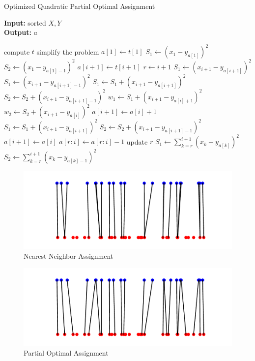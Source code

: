 \documentclass[a4paper,12pt]{article}
\begin{document}
\begin{algorithm}
\caption{Optimized Quadratic Partial Optimal Assignment}\label{a_quad_opt}
\hspace*{\algorithmicindent} \textbf{Input:} sorted $X,Y$\\
\hspace*{\algorithmicindent} \textbf{Output:} $a$ 
\begin{algorithmic}[1]
\State compute $t$
\State simplify the problem
\State $a[1] \gets t[1]$
\State $S_1 \gets (x_{1} - y_{a[1]})^2$
\State $S_2 \gets (x_{1} - y_{a[1]-1})^2$
		\State $a[i+1] \gets t[i+1]$
			\State $r \gets i+1$
			\State $S_1 \gets (x_{i+1} - y_{a[i+1]})^2$
			\State $S_1 \gets (x_{i+1} - y_{a[i+1]-1})^2$
		\Else {}
        	\State $S_1 \gets S_1 + (x_{i+1} - y_{a[i+1]})^2$
        	\State $S_2 \gets S_2 + (x_{i+1} - y_{a[i+1]-1})^2$			
		\EndIf
    \Else
        \State $w_1 \gets S_1 + (x_{i+1} - y_{a[i]+1})^2$
        \State $w_2 \gets S_2 + (x_{i+1} - y_{a[i]})^2$
         
        	\State $a[i+1] \gets a[i]+1$
        	\State $S_1 \gets S_1 + (x_{i+1} - y_{a[i+1]})^2$
        	\State $S_2 \gets S_2 + (x_{i+1} - y_{a[i+1]-1})^2$
        \Else {}
        	\State $a[i+1] \gets a[i]$
        	\State $a[r:i] \gets a[r:i]-1$
        	\State update $r$
        	\State $S_1 \gets \sum_{k=r}^{i+1} (x_k - y_{a[k]})^2$
        	\State $S_2 \gets \sum_{k=r}^{i+1} (x_k - y_{a[k]-1})^2$
        \EndIf
    \EndIf
\EndFor
\State {}
\end{algorithmic}
\end{algorithm}

\begin{figure}[H]
\includegraphics[width = \columnwidth]{t_fig.pdf}
\caption{Nearest Neighbor Assignment}\label{t_fig}
\end{figure}

\begin{figure}[H]
\includegraphics[width = \columnwidth]{a_fig.pdf}
\caption{Partial Optimal Assignment}\label{a_fig}
\end{figure}
\end{document}
